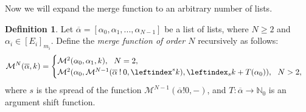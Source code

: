\documentclass[a4paper, 10pt]{article}
\theoremstyle{plain}
\newtheorem{proposition}[theorem]{Proposition}
\theoremstyle{definition}
\newtheorem{definition}[theorem]{Definition}
\newcommand{\N}{\mathbb{N}}
\newcommand{\wo}{\mathbin{!}}
\newcommand{\li}{\leftindex}
\newcommand{\m}{\mathcal{M}}
\begin{document}
%

Now we will expand the merge function to an arbitrary number of lists.\\

\begin{definition}
  Let $\overline{\alpha} = [\alpha_0, \alpha_1, ..., \alpha_{N-1}]$ be a list of lists, where $N \ge 2$ and $\alpha_i \in [E_i]_{m_i}$. Define the \emph{merge function of order $N$} recursively as follows:
  \begin{align}
    \label{mNdef}
    \m^N (\overline{\alpha}, k) = \begin{cases}
      \m^2 (\alpha_0, \alpha_1, k),\ \ N = 2,\\
      \m^2 (\alpha_0, \m^{N-1} (\overline{\alpha} \wo 0, \li^s k), \li_s k + T(\alpha_0)),\ \ N > 2,
    \end{cases}
  \end{align}
  where $s$ is the spread of the function $\m^{N-1} (\overline{\alpha} \wo 0, -)$, and $T \colon \overline{\alpha} \to \N_0$ is an argument shift function.\\
\end{definition}
\end{document}
